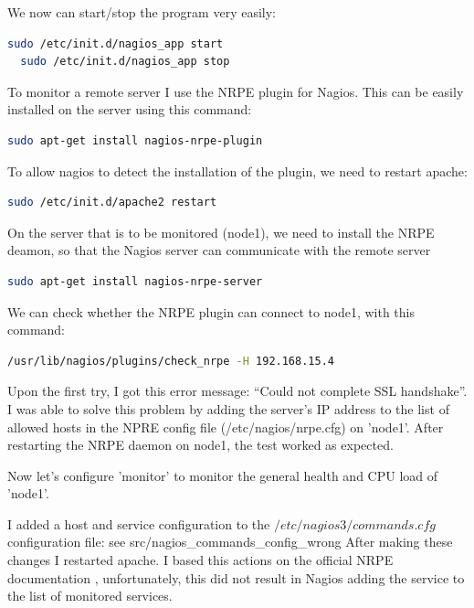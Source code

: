 \documentclass[12pt]{report}
\begin{document}
We now can start/stop the program very easily:
\begin{lstlisting}[language=bash]
  sudo /etc/init.d/nagios_app start
  sudo /etc/init.d/nagios_app stop
\end{lstlisting}

To monitor a remote server I use the NRPE plugin for Nagios. 
This can be easily installed on the server using this command:
\begin{lstlisting}[language=bash]
  sudo apt-get install nagios-nrpe-plugin
\end{lstlisting} 

To allow nagios to detect the installation of the plugin, we need to
restart apache:
\begin{lstlisting}[language=bash]
  sudo /etc/init.d/apache2 restart
\end{lstlisting} 

On the server that is to be monitored (node1), we need to install the NRPE
deamon, so that the Nagios server can communicate with the remote
server
\begin{lstlisting}[language=bash]
  sudo apt-get install nagios-nrpe-server
\end{lstlisting} 

We can check whether the NRPE plugin can connect to node1, with this command:
\begin{lstlisting}[language=bash]
  /usr/lib/nagios/plugins/check_nrpe -H 192.168.15.4
\end{lstlisting} 
Upon the first try, I got this error message: ``Could not complete SSL
handshake''.
I was able to solve this problem by adding the server's IP address to
the list of allowed hosts in the NPRE config file
(/etc/nagios/nrpe.cfg) on 'node1'.
After restarting the NRPE daemon on node1, the test worked as
expected.

Now let's configure 'monitor' to monitor the general health and CPU load of  'node1'.

I added a host and service configuration to the
$/etc/nagios3/commands.cfg$ configuration file:
see src/nagios\_commands\_config\_wrong
After making these changes I restarted apache.
I based this actions on the official NRPE documentation
\cite{nrpe_doc}, unfortunately, this did not result in Nagios adding
the service to the list of monitored services.
\end{document}
